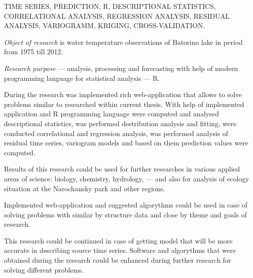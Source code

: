 \documentclass[a4paper,12pt]{report}
\begin{document}
	TIME SERIES, PREDICTION, R, DESCRIPTIONAL STATISTICS, CORRELATIONAL ANALYSIS, REGRESSION ANALYSIS, RESIDUAL ANALYSIS, VARIOGRAMM, KRIGING, CROSS-VALIDATION.

	\textit{Object of research} is water temperature observations of Batorino lake in period from 1975 till 2012.

	\textit{Research purpose} --- analysis, processing and forecasting with help of modern programming language for statistical analysis --- R.

	During the research was implemented rich web-application that allows to solve problems similar to researched within current thesis. With help of implemented application and R programming language were computed and analysed descriptional statistics, was performed destribution analysis and fitting, were conducted correlational and regression analysis, was performed analysis of residual time series, variogram models and based on them prediction values were computed.

	Results of this research could be used for further researches in various applied areas of science: biology, chemistry, hydrology, --- and also for analysis of ecology situation at the Narochansky park and other regions.

	Implemented web-application and suggested algorythms could be used in case of solving problems with similar by structure data and close by theme and goals of research.

	This research could be continued in case of getting model that will be more accurate in describing source time series. Software and algorythms that were obtained during the research could be enhanced during further research for solving different problems.
\end{document}
